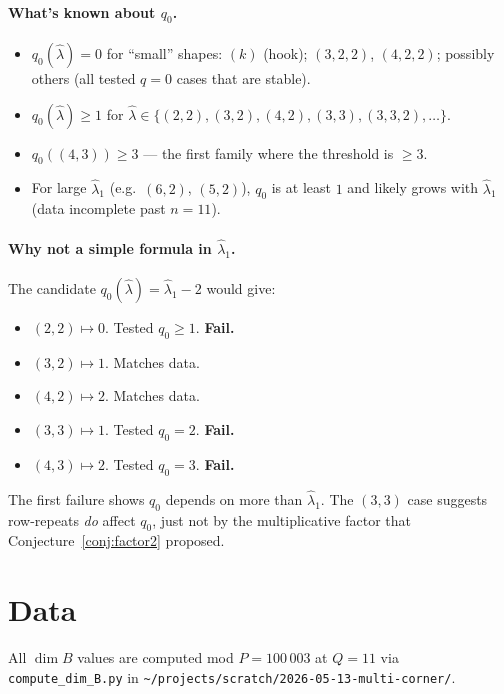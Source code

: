\documentclass[11pt]{article}
\theoremstyle{definition}
\begin{document}
\paragraph{What's known about $q_0$.}
\begin{itemize}[topsep=0.3em,itemsep=0.2em]
\item $q_0(\widehat\lambda) = 0$ for ``small'' shapes:
$(k)$ (hook); $(3, 2, 2)$, $(4, 2, 2)$; possibly others (all tested
$q = 0$ cases that are stable).
\item $q_0(\widehat\lambda) \ge 1$ for $\widehat\lambda \in \{(2, 2),
(3, 2), (4, 2), (3, 3), (3, 3, 2), \ldots\}$.
\item $q_0((4, 3)) \ge 3$ — the first family where the threshold is
$\ge 3$.
\item For large $\widehat\lambda_1$ (e.g.\ $(6, 2)$, $(5, 2)$), $q_0$
is at least $1$ and likely grows with $\widehat\lambda_1$ (data
incomplete past $n = 11$).
\end{itemize}

\paragraph{Why not a simple formula in $\widehat\lambda_1$.}
The candidate $q_0(\widehat\lambda) = \widehat\lambda_1 - 2$ would
give:
\begin{itemize}
\item $(2, 2) \mapsto 0$. Tested $q_0 \ge 1$. \textbf{Fail.}
\item $(3, 2) \mapsto 1$. Matches data.
\item $(4, 2) \mapsto 2$. Matches data.
\item $(3, 3) \mapsto 1$. Tested $q_0 = 2$. \textbf{Fail.}
\item $(4, 3) \mapsto 2$. Tested $q_0 = 3$. \textbf{Fail.}
\end{itemize}
The first failure shows $q_0$ depends on more than $\widehat\lambda_1$.
The $(3, 3)$ case suggests row-repeats \emph{do} affect $q_0$, just
not by the multiplicative factor that Conjecture~\ref{conj:factor2}
proposed.

\section{Data}\label{sec:data}

All $\dim B$ values are computed mod $P = 100\,003$ at $Q = 11$ via
\texttt{compute\_dim\_B.py} in
\texttt{\textasciitilde/projects/scratch/2026-05-13-multi-corner/}.
\end{document}
